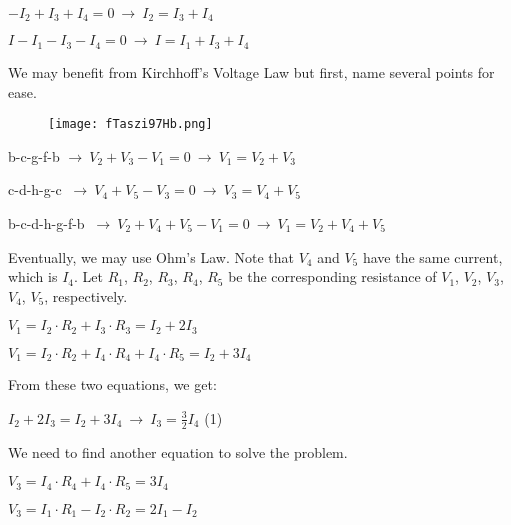 \documentclass{article}
\begin{document}
{\Large $-I_2 + I_3 + I_4 = 0 \ \rightarrow \ I_2 = I_3 + I_4 $}

{\Large $I - I_1 - I_3 - I_4 = 0 \ \rightarrow \ I = I_1 + I_3 + I_4 $}

\vspace{4mm}

{\Large We may benefit from Kirchhoff's Voltage Law but first, name several points for ease.}

\begin{figure}[H]
    \centering
    \texttt{[image: fTaszi97Hb.png]}
\end{figure}

{\Large b-c-g-f-b $ \rightarrow \ V_2 + V_3 - V_1 = 0 \ \rightarrow \  V_1 = V_2 + V_3 $}

{\Large c-d-h-g-c $\ \rightarrow \ V_4 + V_5 - V_3 = 0 \ \rightarrow \ V_3 = V_4 + V_5 $}

{\Large b-c-d-h-g-f-b $\ \rightarrow \ V_2 + V_4 + V_5 - V_1 = 0 \ \rightarrow \ V_1 = V_2 + V_4 + V_5 $}

\vspace{4mm}

{\Large Eventually, we may use Ohm's Law. Note that $V_4$ and $V_5$ have the same current, which is $I_4$. Let $R_1$, $R_2$, $R_3$, $R_4$, $R_5$ be the corresponding resistance of $V_1$, $V_2$, $V_3$, $V_4$, $V_5$, respectively.}

\vspace{4mm}

{\Large $V_1 = I_2\cdot R_2 + I_3\cdot R_3 = I_2 + 2I_3$}

{\Large $V_1 = I_2\cdot R_2 + I_4 \cdot R_4 + I_4 \cdot R_5 = I_2 + 3I_4$}

\vspace{4mm}

{\Large From these two equations, we get:}

\vspace{4mm}

{\Large $\displaystyle I_2 + 2I_3 = I_2 + 3I_4 \ \rightarrow \ I_3 = \frac{3}{2}I_4$ (1)}

\vspace{4mm}

{\Large We need to find another equation to solve the problem.}

\vspace{4mm}

{\Large $V_3 = I_4\cdot R_4 + I_4\cdot R_5 = 3I_4$}

{\Large $V_3 = I_1\cdot R_1 - I_2\cdot R_2 = 2I_1 - I_2$}
\end{document}
